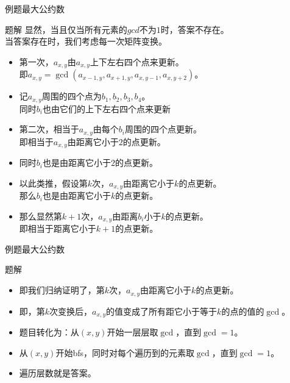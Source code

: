 \documentclass[9pt, c]{beamer}	%
\theoremstyle{plain}
\theoremstyle{definition}
\theoremstyle{remark}
\numberwithin{equation}{section}
\begin{document}
\begin{frame}[fragile]{例题}{最大公约数}
  \begin{block}{题解}
    显然，当且仅当所有元素的$gcd$不为$1$时，答案不存在。\\
    \pause
    当答案存在时，我们考虑每一次矩阵变换。
    \begin{itemize}
      \pause
      \item 第一次，$a_{x,y}$由$a_{x,y}$上下左右四个点来更新。\\
      即$a_{x,y}=\gcd(a_{x-1,y},a_{x+1,y},a_{x,y-1},a_{x,y+2})$。
      \item 记$a_{x,y}$周围的四个点为$b_1,b_2,b_3,b_4$。\\
      同时$b_i$也由它们的上下左右四个点来更新
      \pause
      \item 第二次，相当于$a_{x,y}$由每个$b_i$周围的四个点更新。\\
      即相当于$a_{x,y}$由距离它小于$2$的点更新。
      \item 同时$b_i$也是由距离它小于$2$的点更新。
      \pause
      \item 以此类推，假设第$k$次，$a_{x,y}$由距离它小于$k$的点更新。\\
      那么$b_i$也是由距离它小于$k$的点更新。
      \pause
      \item 那么显然第$k+1$次，$a_{x,y}$由距离$b_i$小于$k$的点更新。\\
      即相当于距离它小于$k+1$的点更新。
    \end{itemize}
  \end{block}
\end{frame}

\begin{frame}[fragile]{例题}{最大公约数}
  \begin{block}{题解}
    \begin{itemize}
      \item 即我们归纳证明了，第$k$次，$a_{x,y}$由距离它小于$k$的点更新。
      \item 即，第$k$次变换后，$a_{x,y}$的值变成了所有距它小于等于$k$的点的值的$\gcd$。
      \pause
      \item 题目转化为：从$(x,y)$开始一层层取$\gcd$，直到$\gcd=1$。
      \pause
      \item 从$(x,y)$开始bfs，同时对每个遍历到的元素取$\gcd$，直到$\gcd=1$。
      \item 遍历层数就是答案。
    \end{itemize}
  \end{block}
  
\end{frame}
\end{document}
